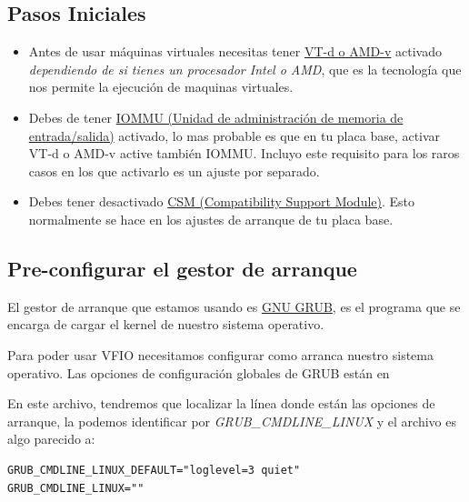 \documentclass[11pt]{article}
\begin{document}
\subsection{Pasos Iniciales}

\begin{itemize}
\setlength\itemsep{-0.2em}
\item Antes de usar máquinas virtuales necesitas tener \href{https://en.wikipedia.org/wiki/X86_virtualization#Intel-VT-d}{VT-d o AMD-v} activado \textit{dependiendo de si tienes un procesador Intel o AMD}, que es la tecnología que nos permite la ejecución de maquinas virtuales.
\item Debes de tener \href{https://en.wikipedia.org/wiki/Input\%E2\%80\%93output_memory_management_unit}{IOMMU (Unidad de administración de memoria de entrada/salida)} activado, lo mas probable es que en tu placa base, activar VT-d o AMD-v active también IOMMU. Incluyo este requisito para los raros casos en los que activarlo es un ajuste por separado.
\item Debes tener desactivado \href{https://en.wikipedia.org/wiki/UEFI#CSM_booting}{CSM (Compatibility Support Module)}. Esto normalmente se hace en los ajustes de arranque de tu placa base.
\end{itemize}

\subsection{Pre-configurar el gestor de arranque}

El gestor de arranque que estamos usando es \href{https://es.wikipedia.org/wiki/GNU_GRUB}{GNU GRUB}, es el programa que se encarga de cargar el kernel de nuestro sistema operativo.

\vspace{5pt}

Para poder usar VFIO necesitamos configurar como arranca nuestro sistema operativo. Las opciones de configuración globales de GRUB están en 

\vspace{5pt}

En este archivo, tendremos que localizar la línea donde están las opciones de arranque, la podemos identificar por \textit{GRUB\_CMDLINE\_LINUX} y el archivo es algo parecido a:

\begin{verbatim}
GRUB_CMDLINE_LINUX_DEFAULT="loglevel=3 quiet"
GRUB_CMDLINE_LINUX=""
\end{verbatim}
\end{document}

